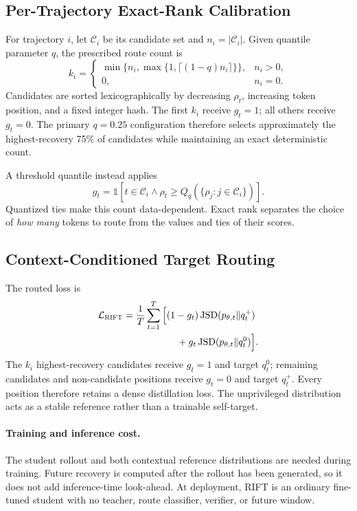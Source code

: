 \documentclass[letterpaper]{article}
\newcommand{\RIFT}{\textsc{RIFT}}
\newcommand{\JSD}{\operatorname{JSD}}
\newcommand{\Ind}{\mathbb{1}}
\begin{document}
\subsection{Per-Trajectory Exact-Rank Calibration}

For trajectory $i$, let $\mathcal C_i$ be its candidate set and
$n_i=|\mathcal C_i|$. Given quantile parameter $q$, the prescribed route count
is
\begin{equation}
k_i=
\begin{cases}
\min\{n_i,\max\{1,\lceil(1-q)n_i\rceil\}\}, & n_i>0,\\
0, & n_i=0.
\end{cases}
\label{eq:budget}
\end{equation}
Candidates are sorted lexicographically by decreasing $\rho_t$, increasing
token position, and a fixed integer hash. The first $k_i$ receive $g_t=1$; all
others receive $g_t=0$. The primary $q=0.25$ configuration therefore selects
approximately the highest-recovery 75\% of candidates while maintaining an
exact deterministic count.

A threshold quantile instead applies
\begin{equation}
g_t=\Ind[t\in\mathcal C_i\land \rho_t\geq
Q_q(\{\rho_j:j\in\mathcal C_i\})].
\end{equation}
Quantized ties make this count data-dependent. Exact rank separates the choice
of \emph{how many} tokens to route from the values and ties of their scores.

\subsection{Context-Conditioned Target Routing}

The routed loss is
\begin{align}
\mathcal L_{\RIFT}
&=\frac{1}{T}\sum_{t=1}^{T}\Big[
(1-g_t)\JSD(p_{\theta,t}\Vert q_t^+)\nonumber\\
&\hspace{5.6em}+g_t\JSD(p_{\theta,t}\Vert q_t^0)\Big].
\label{eq:riftloss}
\end{align}
The $k_i$ highest-recovery candidates receive $g_t=1$ and target $q_t^0$;
remaining candidates and non-candidate positions receive $g_t=0$ and target
$q_t^+$. Every position therefore retains a dense distillation loss. The
unprivileged distribution acts as a stable reference rather than a trainable
self-target.

\paragraph{Training and inference cost.}
The student rollout and both contextual reference distributions are needed
during training.
Future recovery is computed after the rollout has been generated, so it does
not add inference-time look-ahead. At deployment, \RIFT{} is an ordinary
fine-tuned student with no teacher, route classifier, verifier, or future
window.
\end{document}
